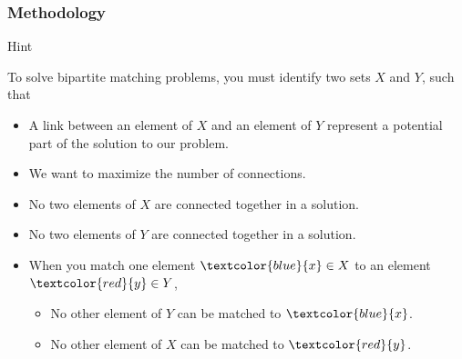 \documentclass{beamer}
\newcommand{\uvalink}[2]{UVa Online Judge (http://uva.onlinejudge.org)
  problem number \href{#2}{\textcolor{blue}{#1}.}}
\newcommand{\spojlink}[2]{Sphere Online Judge (http://www.spoj.com)
  problem: \href{#2}{\textcolor{blue}{#1}.}}
\newcommand{\hint}[1]{
\begin{bclogo}[arrondi=0.1, logo=\bclampe]{Hint}
#1
\end{bclogo}
}
\newcounter{exo}
\newcommand{\exo}{
  \addtocounter{exo}{1}
  Exercice \arabic{exo}
}
\begin{document}
\begin{frame}%
\frametitle{Methodology}

\hint{
\footnotesize
To solve bipartite matching problems, you must identify two sets $X$ and $Y$, such that

\begin{itemize}

\item A link between an element of $X$ and an element of $Y$ represent a potential part of the solution
to our problem.

\vspace{0.1cm}

\item<2-> We want to maximize the number of connections.

\vspace{0.1cm}

\item<3-> No two elements of $X$ are connected together in a solution.

\vspace{0.1cm}

\item<4-> No two elements of $Y$ are connected together in a solution.

\vspace{0.1cm}

\item<5-> When you match one element $\textcolor{blue}{x} \in X$ to an element
$\textcolor{red}{y} \in Y$,
\begin{itemize}
\footnotesize
\item<5-> No other element of $Y$ can be matched to $\textcolor{blue}{x}$.
\vspace{0.08cm}
\item<6-> No other element of $X$ can be matched to $\textcolor{red}{y}$.
\vspace{0.1cm}
\end{itemize}

\end{itemize}

}

\end{frame}

\end{document}
